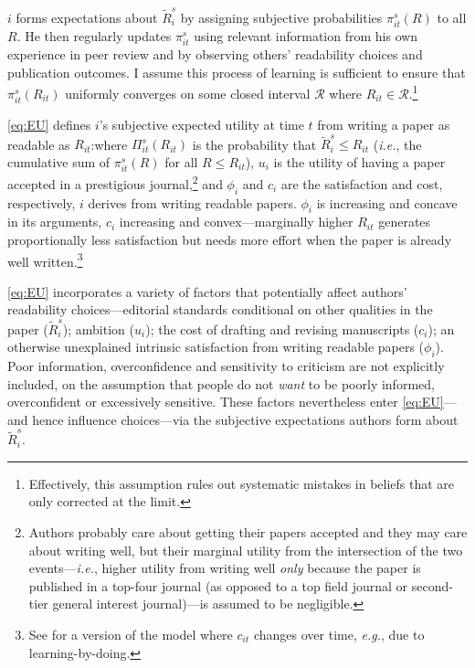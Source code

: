 $i$ forms expectations about $\widetilde R_i^s$ by assigning subjective probabilities $\pi_{it}^s(R)$ to all $R$. He then regularly updates $\pi_{it}^s$ using relevant information from his own experience in peer review and by observing others' readability choices and publication outcomes. I assume this process of learning is sufficient to ensure that $\pi_{it}^s(R_{it})$ uniformly converges on some closed interval $\mathcal R$ where $R_{it}\in\mathcal R$.\footnote{Effectively, this assumption rules out systematic mistakes in beliefs that are only corrected at the limit.}

\autoref{eq:EU} defines $i$'s subjective expected utility at time $t$ from writing a paper as readable as $R_{it}$:where $\Pi_{it}^s(R_{it})$ is the probability that $\widetilde R_i^s\le R_{it}$ (\emph{i.e.}, the cumulative sum of $\pi_{it}^s(R)$ for all $R\le R_{it}$), $u_i$ is the utility of having a paper accepted in a prestigious journal,\footnote{Authors probably care about getting their papers accepted and they may care about writing well, but their marginal utility from the intersection of the two events---\emph{i.e.}, higher utility from writing well \emph{only} because the paper is published in a top-four journal (as opposed to a top field journal or second-tier general interest journal)---is assumed to be negligible.} and $\phi_i$ and $c_{i}$ are the satisfaction and cost, respectively, $i$ derives from writing readable papers. $\phi_i$ is increasing and concave in its arguments, $c_{i}$ increasing and convex---marginally higher $R_{it}$ generates proportionally less satisfaction but needs more effort when the paper is already well written.\footnote{See  \citet{Hengel2020} for a version of the model where $c_{it}$ changes over time, \emph{e.g.}, due to learning-by-doing.}

\autoref{eq:EU} incorporates a variety of factors that potentially affect authors' readability choices---editorial standards conditional on other qualities in the paper ($\widetilde R_i^s$); ambition ($u_i$); the cost of drafting and revising manuscripts ($c_{i}$); an otherwise unexplained intrinsic satisfaction from writing readable papers ($\phi_i$). Poor information, overconfidence and sensitivity to criticism are not explicitly included, on the assumption that people do not \emph{want} to be poorly informed, overconfident or excessively sensitive. These factors nevertheless enter \autoref{eq:EU}---and hence influence choices---via the subjective expectations authors form about $\widetilde R_i^s$.

